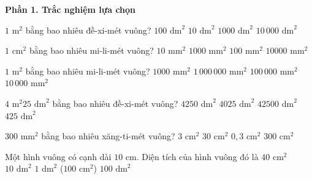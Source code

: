 \textbf{Phần 1. Trắc nghiệm lựa chọn}

\begin{ex} %
$1\text{ m}^2$ bằng bao nhiêu đề-xi-mét vuông?
\choice
{\True $100\text{ dm}^2$}
{$10\text{ dm}^2$}
{$1000\text{ dm}^2$}
{$10\,000\text{ dm}^2$}
\end{ex}

\begin{ex} %
$1\text{ cm}^2$ bằng bao nhiêu mi-li-mét vuông?
\choice
{$10\text{ mm}^2$}
{$1000\text{ mm}^2$}
{\True $100\text{ mm}^2$}
{$10000\text{ mm}^2$}
\end{ex}

\begin{ex} %
$1\text{ m}^2$ bằng bao nhiêu mi-li-mét vuông?
\choice
{$1000\text{ mm}^2$}
{\True $1\,000\,000\text{ mm}^2$}
{$100\,000\text{ mm}^2$}
{$10\,000\text{ mm}^2$}
\end{ex}

\begin{ex} %
$4\text{ m}^2 25\text{ dm}^2$ bằng bao nhiêu đề-xi-mét vuông?
\choice
{$4250\text{ dm}^2$}
{$4025\text{ dm}^2$}
{$42500\text{ dm}^2$}
{\True $425\text{ dm}^2$}
\end{ex}

\begin{ex} %
$300\text{ mm}^2$ bằng bao nhiêu xăng-ti-mét vuông?
\choice
{\True $3\text{ cm}^2$}
{$30\text{ cm}^2$}
{$0{,}3\text{ cm}^2$}
{$300\text{ cm}^2$}
\end{ex}

\begin{ex} %
Một hình vuông có cạnh dài $10\text{ cm}$. Diện tích của hình vuông đó là
\choice
{$40\text{ cm}^2$}
{$10\text{ dm}^2$}
{\True $1\text{ dm}^2$ ($100\text{ cm}^2$)}
{$100\text{ dm}^2$}
\end{ex}


